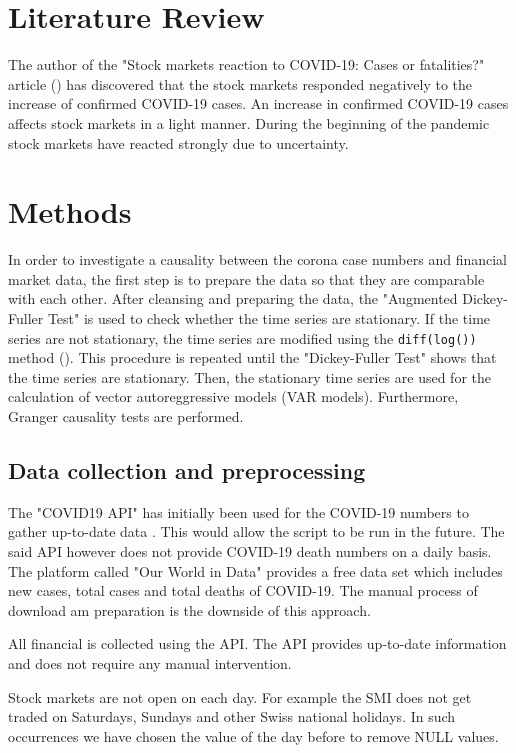 \documentclass[11pt]{article}
\begin{document}
\section{Literature Review}
The author of the "Stock markets reaction to COVID-19: Cases or fatalities?" article (\cite{stock-covid-reaction}) has discovered that the stock markets responded negatively to the increase of confirmed COVID-19 cases. An increase in confirmed COVID-19 cases affects stock markets in a light manner. During the beginning of the pandemic stock markets have reacted strongly due to uncertainty.



\section{Methods}
In order to investigate a causality between the corona case numbers and financial market data, the first step is to prepare the data so that they are comparable with each other. After cleansing and preparing the data, the "Augmented Dickey-Fuller Test" is used to check whether the time series are stationary. If the time series are not stationary, the time series are modified using the \lstinline{diff(log())} method (). This procedure is repeated until the "Dickey-Fuller Test" shows that the time series are stationary. Then, the stationary time series are used for the calculation of vector autoreggressive models (VAR models). Furthermore, Granger causality tests are performed.

\subsection{Data collection and preprocessing}
The "COVID19 API" has initially been used for the COVID-19 numbers to gather up-to-date data \cite{covid-api}. This would allow the script to be run in the future. The said API however does not provide COVID-19 death numbers on a daily basis. The platform called "Our World in Data" provides a free data set which includes new cases, total cases and total deaths of COVID-19. The manual process of download am preparation is the downside of this approach.

All financial is collected using the \cite{yahoo-finance} API. The API provides up-to-date information and does not require any manual intervention.

Stock markets are not open on each day. For example the SMI does not get traded on Saturdays, Sundays and other Swiss national holidays. In such occurrences we have chosen the value of the day before to remove NULL values. 
\end{document}
